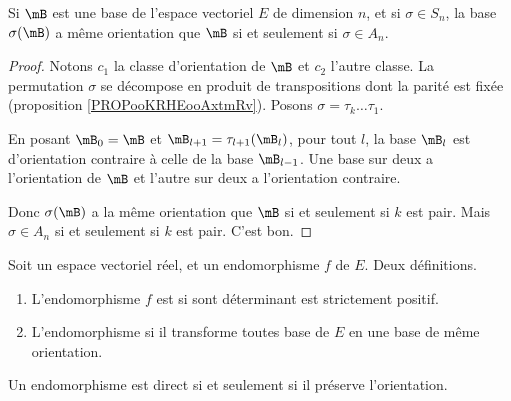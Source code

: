 \begin{corollary}
	Si \( \mB\) est une base de l'espace vectoriel \( E\) de dimension \( n\), et si \( \sigma\in S_n\), la base \( \sigma(\mB)\) a même orientation que \( \mB\) si et seulement si \( \sigma\in A_n\).
\end{corollary}

\begin{proof}
	Notons \( c_1\) la classe d'orientation de \( \mB\) et \( c_2\) l'autre classe. La permutation \( \sigma\) se décompose en produit de transpositions dont la parité est fixée (proposition \ref{PROPooKRHEooAxtmRv}). Posons \( \sigma=\tau_k\ldots \tau_1\).

	En posant \( \mB_0=\mB\) et \( \mB_{l+1}=\tau_{l+1}(\mB_l)\), pour tout \( l\), la base \( \mB_l\) est d'orientation contraire à celle de la base \( \mB_{l-1}\). Une base sur deux a l'orientation de \( \mB\) et l'autre sur deux a l'orientation contraire.

	Donc \( \sigma(\mB)\) a la même orientation que \( \mB\) si et seulement si \( k\) est pair. Mais \( \sigma\in A_n\) si et seulement si \( k\) est pair. C'est bon.
\end{proof}

\begin{propositionDef}        \label{PROPooNBAXooKNUrnk}
	Soit un espace vectoriel réel, et un endomorphisme \( f\) de \( E\). Deux définitions.
	\begin{enumerate}
		\item       \label{ITEMooOAXFooLIPHlW}
		      L'endomorphisme \( f\) est  si sont déterminant est strictement positif.
		\item       \label{ITEMooNKYCooXTgKJA}
		      L'endomorphisme  si il transforme toutes base de \( E\) en une base de même orientation.
	\end{enumerate}
	Un endomorphisme est direct si et seulement si il préserve l'orientation.
\end{propositionDef}

